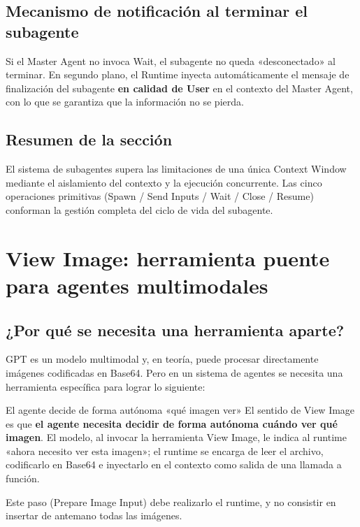 \documentclass[a4paper]{article}
\begin{document}
\subsection{Mecanismo de notificación al terminar el subagente}

Si el Master Agent no invoca Wait, el subagente no queda «desconectado» al terminar. En segundo plano, el Runtime inyecta automáticamente el mensaje de finalización del subagente \textbf{en calidad de User} en el contexto del Master Agent, con lo que se garantiza que la información no se pierda.

\subsection{Resumen de la sección}

El sistema de subagentes supera las limitaciones de una única Context Window mediante el aislamiento del contexto y la ejecución concurrente. Las cinco operaciones primitivas (Spawn / Send Inputs / Wait / Close / Resume) conforman la gestión completa del ciclo de vida del subagente.

\section{View Image: herramienta puente para agentes multimodales}

\subsection{¿Por qué se necesita una herramienta aparte?}

GPT es un modelo multimodal y, en teoría, puede procesar directamente imágenes codificadas en Base64. Pero en un sistema de agentes se necesita una herramienta específica para lograr lo siguiente:

\begin{knowledgebox}{El agente decide de forma autónoma «qué imagen ver»}
El sentido de View Image es que \textbf{el agente necesita decidir de forma autónoma cuándo ver qué imagen}. El modelo, al invocar la herramienta View Image, le indica al runtime «ahora necesito ver esta imagen»; el runtime se encarga de leer el archivo, codificarlo en Base64 e inyectarlo en el contexto como salida de una llamada a función.

Este paso (Prepare Image Input) debe realizarlo el runtime, y no consistir en insertar de antemano todas las imágenes.
\end{knowledgebox}
\end{document}
